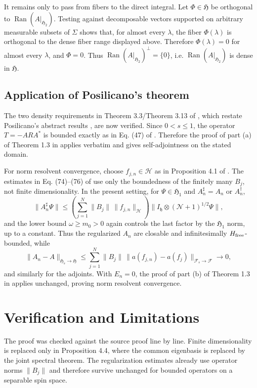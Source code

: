 \documentclass[11pt]{article}
\newcommand{\hhilb}{\mathfrak h}
\newcommand{\HH}{\mathcal H}
\newcommand{\FF}{\mathcal F}
\newcommand{\G}{\mathfrak H}
\newcommand{\ran}{\operatorname{Ran}}
\begin{document}
It remains only to pass from fibers to the direct integral. Let
$\Phi\in\G$ be orthogonal to $\ran(A|_{\G_2})$. Testing against decomposable
vectors supported on arbitrary measurable subsets of $\Sigma$ shows that, for
almost every $\lambda$, the fiber $\Phi(\lambda)$ is orthogonal to the dense
fiber range displayed above. Therefore $\Phi(\lambda)=0$ for almost every
$\lambda$, and $\Phi=0$. Thus $\ran(A|_{\G_2})^\perp=\{0\}$, i.e.
$\ran(A|_{\G_2})$ is dense in $\G$.

\subsection*{Application of Posilicano's theorem}

The two density requirements in Theorem 3.3/Theorem 3.13 of \cite{LL}, which
restate Posilicano's abstract results \cite{Pos}, are now verified. Since
$0<s\le1$, the operator $T=-ARA^*$ is bounded exactly as in Eq. (47) of
\cite{LL}. Therefore the proof of part (a) of Theorem 1.3 in \cite{LL} applies
verbatim and gives self-adjointness on the stated domain.

For norm resolvent convergence, choose $f_{j,n}\in\HH$ as in Proposition 4.1 of
\cite{LL}. The estimates in Eq. (74)--(76) of \cite{LL} use only the boundedness
of the finitely many $B_j$, not finite dimensionality. In the present setting,
for $\Psi\in\G_1$ and $A_n^\sharp=A_n$ or $A_n^\dagger$,
\[
\|A_n^\sharp\Psi\|
\le
\left(\sum_{j=1}^N \|B_j\|\,\|f_{j,n}\|_{\HH}\right)
\|I_{\hhilb}\otimes(\mathcal N+1)^{1/2}\Psi\|,
\]
and the lower bound $\omega\ge m_0>0$ again controls the last factor by the
$\G_1$ norm, up to a constant. Thus the regularized $A_n$ are closable and
infinitesimally $H_{\rm free}$-bounded, while
\[
\|A_n-A\|_{\G_s\to\G}
\le\sum_{j=1}^N \|B_j\|\,\|a(f_{j,n})-a(f_j)\|_{\FF_s\to\FF}\to0,
\]
and similarly for the adjoints. With $E_n=0$, the proof of part (b) of Theorem
1.3 in \cite{LL} applies unchanged, proving norm resolvent convergence.

\section*{Verification and Limitations}

The proof was checked against the source proof line by line. Finite
dimensionality is replaced only in Proposition 4.4, where the common eigenbasis
is replaced by the joint spectral theorem. The regularization estimates already
use operator norms $\|B_j\|$ and therefore survive unchanged for bounded
operators on a separable spin space.
\end{document}
